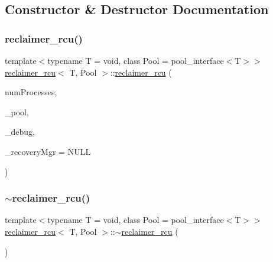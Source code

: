 \subsection{Constructor \& Destructor Documentation}
\mbox{\label{classreclaimer__rcu_a5ead65ca8fdc3bd6a77c447af6681992}} 
\subsubsection{\texorpdfstring{reclaimer\+\_\+rcu()}{reclaimer\_rcu()}}
{\footnotesize\ttfamily template$<$typename T  = void, class Pool  = pool\+\_\+interface$<$\+T$>$$>$ \\
\hyperlink{classreclaimer__rcu}{reclaimer\+\_\+rcu}$<$ T, Pool $>$\+::\hyperlink{classreclaimer__rcu}{reclaimer\+\_\+rcu} (\begin{DoxyParamCaption}\item[{const int}]{num\+Processes,  }\item[{Pool $\ast$}]{\+\_\+pool,  }\item[{\hyperlink{classdebugInfo}{debug\+Info} $\ast$const}]{\+\_\+debug,  }\item[{\hyperlink{classRecoveryMgr}{Recovery\+Mgr}$<$ void $\ast$$>$ $\ast$const}]{\+\_\+recovery\+Mgr = {\ttfamily NULL} }\end{DoxyParamCaption})\hspace{0.3cm}{\ttfamily [inline]}}

\mbox{\label{classreclaimer__rcu_a1bf4a6cc53e4f41bd6eb779bdf882605}} 
\subsubsection{\texorpdfstring{$\sim$reclaimer\+\_\+rcu()}{~reclaimer\_rcu()}}
{\footnotesize\ttfamily template$<$typename T  = void, class Pool  = pool\+\_\+interface$<$\+T$>$$>$ \\
\hyperlink{classreclaimer__rcu}{reclaimer\+\_\+rcu}$<$ T, Pool $>$\+::$\sim$\hyperlink{classreclaimer__rcu}{reclaimer\+\_\+rcu} (\begin{DoxyParamCaption}{ }\end{DoxyParamCaption})\hspace{0.3cm}{\ttfamily [inline]}}



